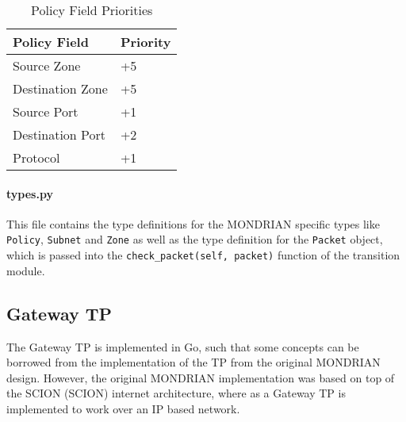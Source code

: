 \begin{table}[t]
\centering
\begin{tabular}{@{}p{}p{}@{}}\toprule
    \textbf{Policy Field} & \textbf{Priority} \\\midrule
    Source Zone & +5\\
    Destination Zone & +5\\
    Source Port & +1\\
    Destination Port & +2\\
    Protocol & +1\\
    \bottomrule
\end{tabular}
    \caption{Policy Field Priorities}
    \label{Policy Field Priorities}
\end{table}


\paragraph{types.py} This file contains the type definitions for the MONDRIAN specific types like \texttt{Policy}, \texttt{Subnet} and \texttt{Zone} as well as the type definition for the \texttt{Packet} object, which is passed into the \texttt{check\_packet(self, packet)} function of the transition module.


\subsection{Gateway TP}
The Gateway \acs{TP} is implemented in Go, such that some concepts can be borrowed from the implementation of the \acs{TP} from the original MONDRIAN design. However, the original MONDRIAN implementation was based on top of the \acs{SCION} (\acl{SCION}) \cite{perrig2017scion} internet architecture, where as a Gateway \acs{TP} is implemented to work over an \acs{IP} based network. 

